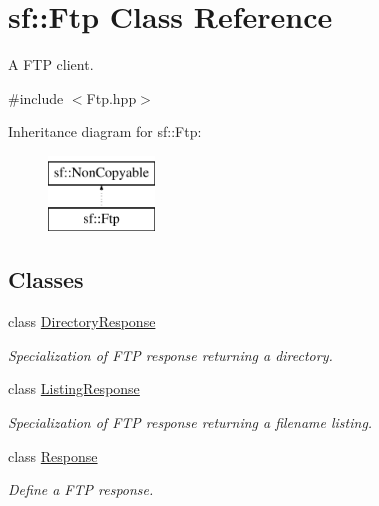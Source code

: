 \hypertarget{classsf_1_1_ftp}{}\section{sf\+:\+:Ftp Class Reference}
\label{classsf_1_1_ftp}


A F\+TP client.  




{\ttfamily \#include $<$Ftp.\+hpp$>$}

Inheritance diagram for sf\+:\+:Ftp\+:\begin{figure}[H]
\begin{center}
\leavevmode
\includegraphics[height=2.000000cm]{classsf_1_1_ftp}
\end{center}
\end{figure}
\subsection*{Classes}
\begin{DoxyCompactItemize}
\item 
class \mbox{\hyperlink{classsf_1_1_ftp_1_1_directory_response}{Directory\+Response}}
\begin{DoxyCompactList}\small\item\em Specialization of F\+TP response returning a directory. \end{DoxyCompactList}\item 
class \mbox{\hyperlink{classsf_1_1_ftp_1_1_listing_response}{Listing\+Response}}
\begin{DoxyCompactList}\small\item\em Specialization of F\+TP response returning a filename listing. \end{DoxyCompactList}\item 
class \mbox{\hyperlink{classsf_1_1_ftp_1_1_response}{Response}}
\begin{DoxyCompactList}\small\item\em Define a F\+TP response. \end{DoxyCompactList}\end{DoxyCompactItemize}
